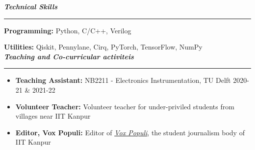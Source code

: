\documentclass[11pt,a4paper]{article}
\begin{document}
\color{myBlue}
\noindent \Large\textbf{\textit{Technical Skills}} \vspace{0.15cm}
\hrule \normalsize
\color{black} \vspace{0.3cm}
\textbf{Programming:} Python, C/C++, Verilog

\textbf{Utilities:} Qiskit, Pennylane, Cirq, PyTorch, TensorFlow, NumPy \\

\color{myBlue}
\noindent \Large\textbf{\textit{Teaching and Co-curricular activiteis}} \vspace{0.15cm}
\hrule \normalsize
\color{black} \vspace{0.3cm}
\begin{itemize}
  \item \textbf{Teaching Assistant:} NB2211 - Electronics Instrumentation, TU Delft \hfill 2020-21 \& 2021-22\vspace{-0.17cm}
  \item \textbf{Volunteer Teacher:} Volunteer teacher for under-priviled students from villages near IIT Kanpur \vspace{-0.17cm}
  \item \textbf{Editor, Vox Populi:} Editor of \href{https://voxiitk.com/}{\textit{Vox Populi}}, the student journalism body of IIT Kanpur
\end{itemize}
\end{document}
